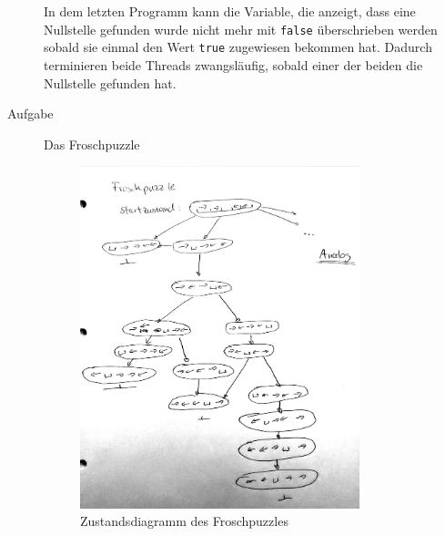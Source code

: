 \documentclass[a4paper,twoside,12pt]{article}
\newcounter{AUFGNR}
\newcommand{\AUFGABE}[2]{\vspace{0.3cm}\item[Aufgabe~\arabic{AUFGNR}]\stepcounter{AUFGNR} #1\hfill\emph{#2}}
\begin{document}
\begin{description}
In dem letzten Programm kann die Variable, die anzeigt, dass eine Nullstelle gefunden wurde nicht mehr mit \texttt{false} überschrieben werden sobald sie einmal den Wert \texttt{true} zugewiesen bekommen hat. Dadurch terminieren beide Threads zwangsläufig, sobald einer der beiden die Nullstelle gefunden hat.

\AUFGABE{Das Froschpuzzle}{}
\begin{figure}[htbp] 
  \centering
     \includegraphics[width=0.8\textwidth]{frog.jpg}
  \caption{Zustandsdiagramm des Froschpuzzles}
\end{figure}
\end{description}
\end{document}

